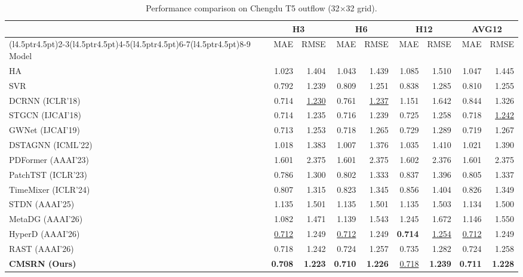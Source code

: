 \begin{table}[!t]
\centering
\caption{Performance comparison on Chengdu T5 outflow (32$\times$32 grid).}
\label{tab:chengdu-outflow}
\begingroup
\fontsize{9}{11}\selectfont
\setlength{\tabcolsep}{4.5pt}
\renewcommand{\arraystretch}{1.12}
\begin{tabular*}{\linewidth}{@{\extracolsep{\fill}}l*{8}{r}@{}}
\toprule
& \multicolumn{2}{c}{H3} & \multicolumn{2}{c}{H6} & \multicolumn{2}{c}{H12} & \multicolumn{2}{c}{AVG12} \\
\cmidrule(l{4.5pt}r{4.5pt}){2-3}\cmidrule(l{4.5pt}r{4.5pt}){4-5}\cmidrule(l{4.5pt}r{4.5pt}){6-7}\cmidrule(l{4.5pt}r{4.5pt}){8-9}
Model & MAE & RMSE & MAE & RMSE & MAE & RMSE & MAE & RMSE \\
\midrule
HA & 1.023 & 1.404 & 1.043 & 1.439 & 1.085 & 1.510 & 1.047 & 1.445 \\
SVR & 0.792 & 1.239 & 0.809 & 1.251 & 0.838 & 1.285 & 0.810 & 1.255 \\
DCRNN (ICLR'18) & 0.714 & \underline{1.230} & 0.761 & \underline{1.237} & 1.151 & 1.642 & 0.844 & 1.326 \\
STGCN (IJCAI'18) & 0.714 & 1.235 & 0.716 & 1.239 & 0.725 & 1.258 & 0.718 & \underline{1.242} \\
GWNet (IJCAI'19) & 0.713 & 1.253 & 0.718 & 1.265 & 0.729 & 1.289 & 0.719 & 1.267 \\
DSTAGNN (ICML'22) & 1.018 & 1.383 & 1.007 & 1.376 & 1.035 & 1.410 & 1.021 & 1.390 \\
PDFormer (AAAI'23) & 1.601 & 2.375 & 1.601 & 2.375 & 1.602 & 2.376 & 1.601 & 2.375 \\
PatchTST (ICLR'23) & 0.786 & 1.300 & 0.802 & 1.333 & 0.837 & 1.396 & 0.805 & 1.337 \\
TimeMixer (ICLR'24) & 0.807 & 1.315 & 0.823 & 1.345 & 0.856 & 1.404 & 0.826 & 1.349 \\
STDN (AAAI'25) & 1.135 & 1.501 & 1.135 & 1.501 & 1.135 & 1.503 & 1.134 & 1.500 \\
MetaDG (AAAI'26) & 1.082 & 1.471 & 1.139 & 1.543 & 1.245 & 1.672 & 1.146 & 1.550 \\
HyperD (AAAI'26) & \underline{0.712} & 1.249 & \underline{0.712} & 1.249 & \textbf{0.714} & \underline{1.254} & \underline{0.712} & 1.249 \\
RAST (AAAI'26) & 0.718 & 1.242 & 0.724 & 1.257 & 0.735 & 1.282 & 0.724 & 1.258 \\
\midrule
\textbf{CMSRN (Ours)} & \textbf{0.708} & \textbf{1.223} & \textbf{0.710} & \textbf{1.226} & \underline{0.718} & \textbf{1.239} & \textbf{0.711} & \textbf{1.228} \\
\bottomrule
\end{tabular*}
\endgroup
\end{table}

